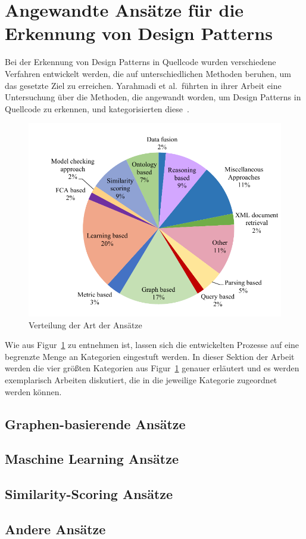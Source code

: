 \section{Angewandte Ansätze für die Erkennung von Design Patterns}

Bei der Erkennung von Design Patterns in Quellcode wurden verschiedene Verfahren entwickelt werden, die auf unterschiedlichen Methoden beruhen, um das gesetzte Ziel zu erreichen.
Yarahmadi et al.~führten in ihrer Arbeit eine Untersuchung über die Methoden, die angewandt worden, um Design Patterns in Quellcode zu erkennen, und kategorisierten diese~\cite[S. 5805]{yarahmadi2020design}.

\begin{figure}[h]
    \centering
    \includegraphics[scale=0.5]{figures/approches_distribution.png}
    \caption{Verteilung der Art der Ansätze}
    \label{fig:approach_dist}
\end{figure}

Wie aus Figur~\ref{fig:approach_dist} zu entnehmen ist, lassen sich die entwickelten Prozesse auf eine begrenzte Menge an Kategorien eingestuft werden.
In dieser Sektion der Arbeit werden die vier größten Kategorien aus Figur~\ref{fig:approach_dist} genauer erläutert und es werden exemplarisch Arbeiten diskutiert,
die in die jeweilige Kategorie zugeordnet werden können. 

\subsection{Graphen-basierende Ansätze}

\subsection{Maschine Learning Ansätze}

\subsection{Similarity-Scoring Ansätze}

\subsection{Andere Ansätze}



